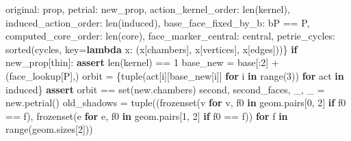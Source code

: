 \documentclass[
  10pt,
  letterpaper,
]{article}
\newenvironment{Shaded}{}{}
\newcommand{\BuiltInTok}[1]{\textcolor[rgb]{0.00,0.50,0.00}{#1}}
\newcommand{\ControlFlowTok}[1]{\textcolor[rgb]{0.00,0.44,0.13}{\textbf{#1}}}
\newcommand{\DecValTok}[1]{\textcolor[rgb]{0.25,0.63,0.44}{#1}}
\newcommand{\KeywordTok}[1]{\textcolor[rgb]{0.00,0.44,0.13}{\textbf{#1}}}
\newcommand{\NormalTok}[1]{#1}
\newcommand{\OperatorTok}[1]{\textcolor[rgb]{0.40,0.40,0.40}{#1}}
\newcommand{\StringTok}[1]{\textcolor[rgb]{0.25,0.44,0.63}{#1}}
\begin{document}
\begin{Shaded}
\begin{Highlighting}[]
           \StringTok{\textquotesingle{}original\textquotesingle{}}\NormalTok{: prop, }\StringTok{\textquotesingle{}petrial\textquotesingle{}}\NormalTok{: new\_prop, }\StringTok{\textquotesingle{}action\_kernel\_order\textquotesingle{}}\NormalTok{: }\BuiltInTok{len}\NormalTok{(kernel),}
           \StringTok{\textquotesingle{}induced\_action\_order\textquotesingle{}}\NormalTok{: }\BuiltInTok{len}\NormalTok{(induced), }\StringTok{\textquotesingle{}base\_face\_fixed\_by\_b\textquotesingle{}}\NormalTok{: bP }\OperatorTok{==}\NormalTok{ P,}
           \StringTok{\textquotesingle{}computed\_core\_order\textquotesingle{}}\NormalTok{: }\BuiltInTok{len}\NormalTok{(core), }\StringTok{\textquotesingle{}face\_marker\_central\textquotesingle{}}\NormalTok{: central,}
           \StringTok{\textquotesingle{}petrie\_cycles\textquotesingle{}}\NormalTok{: }\BuiltInTok{sorted}\NormalTok{(cycles, key}\OperatorTok{=}\KeywordTok{lambda}\NormalTok{ x: (x[}\StringTok{\textquotesingle{}chambers\textquotesingle{}}\NormalTok{], x[}\StringTok{\textquotesingle{}vertices\textquotesingle{}}\NormalTok{], x[}\StringTok{\textquotesingle{}edges\textquotesingle{}}\NormalTok{]))\}}
    \ControlFlowTok{if}\NormalTok{ new\_prop[}\StringTok{\textquotesingle{}thin\textquotesingle{}}\NormalTok{]:}
        \ControlFlowTok{assert} \BuiltInTok{len}\NormalTok{(kernel) }\OperatorTok{==} \DecValTok{1}
\NormalTok{        base\_new }\OperatorTok{=}\NormalTok{ base[:}\DecValTok{2}\NormalTok{] }\OperatorTok{+}\NormalTok{ (face\_lookup[P],)}
\NormalTok{        orbit }\OperatorTok{=}\NormalTok{ \{}\BuiltInTok{tuple}\NormalTok{(act[i][base\_new[i]] }\ControlFlowTok{for}\NormalTok{ i }\KeywordTok{in} \BuiltInTok{range}\NormalTok{(}\DecValTok{3}\NormalTok{)) }\ControlFlowTok{for}\NormalTok{ act }\KeywordTok{in}\NormalTok{ induced\}}
        \ControlFlowTok{assert}\NormalTok{ orbit }\OperatorTok{==} \BuiltInTok{set}\NormalTok{(new.chambers)}
\NormalTok{        second, second\_faces, \_, \_ }\OperatorTok{=}\NormalTok{ new.petrial()}
\NormalTok{        old\_shadows }\OperatorTok{=} \BuiltInTok{tuple}\NormalTok{((}\BuiltInTok{frozenset}\NormalTok{(v }\ControlFlowTok{for}\NormalTok{ v, f0 }\KeywordTok{in}\NormalTok{ geom.pairs[}\DecValTok{0}\NormalTok{, }\DecValTok{2}\NormalTok{] }\ControlFlowTok{if}\NormalTok{ f0 }\OperatorTok{==}\NormalTok{ f),}
                             \BuiltInTok{frozenset}\NormalTok{(e }\ControlFlowTok{for}\NormalTok{ e, f0 }\KeywordTok{in}\NormalTok{ geom.pairs[}\DecValTok{1}\NormalTok{, }\DecValTok{2}\NormalTok{] }\ControlFlowTok{if}\NormalTok{ f0 }\OperatorTok{==}\NormalTok{ f))}
                            \ControlFlowTok{for}\NormalTok{ f }\KeywordTok{in} \BuiltInTok{range}\NormalTok{(geom.sizes[}\DecValTok{2}\NormalTok{]))}

\end{Highlighting}
\end{Shaded}
\end{document}
